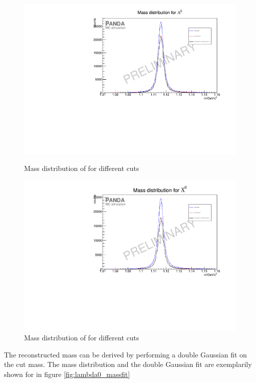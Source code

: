 		\begin{figure}
			\centering
				\includegraphics[width=1.1\textwidth]{./plots/lambda0/lambda0_m_diffcuts.pdf}
			\caption{Mass distribution of \lam for different cuts}
			\label{fig:lambda0_massdiffcuts}
			
				\includegraphics[width=1.1\textwidth]{./plots/antilambda0/antiLambda0_m_diffcuts.pdf}
			\caption{Mass distribution of \alam for different cuts}
			\label{fig:antilambda0_massdiffcuts}
		\end{figure}
		
		The reconstructed mass can be derived by performing a double Gaussian fit on the cut mass.
		The mass distribution and the double Gaussian fit are exemplarily shown for \lam in figure \ref{fig:lambda0_massfit}
		

